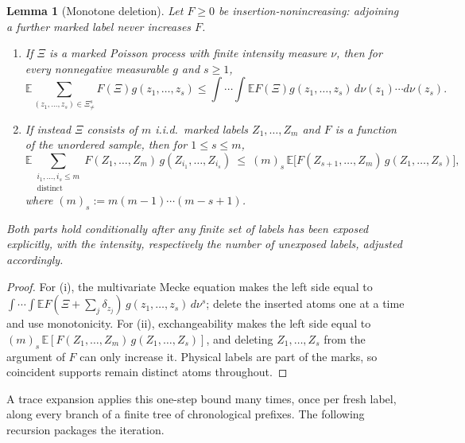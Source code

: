 \documentclass[11pt]{article}
\newtheorem{lemma}[lemma]{Lemma}
\theoremstyle{definition}
\theoremstyle{remark}
\newcommand{\E}{\mathbb E}
\newcommand{\1}{\mathbf 1}
\numberwithin{equation}{section}
\begin{document}
\begin{lemma}[Monotone deletion]\label{lem:poisson-insertion}\label{lem:fixed-deletion}
Let $F\ge0$ be insertion-nonincreasing: adjoining a further marked
label never increases $F$.
\begin{enumerate}
\item If $\Xi$ is a marked Poisson process with finite intensity
measure $\nu$, then for every nonnegative measurable $g$ and $s\ge1$,
\begin{equation}\label{eq:poisson-insertion}
 \E\!\sum_{(z_1,\ldots,z_s)\in\Xi_{\ne}^{s}}
 F(\Xi)g(z_1,\ldots,z_s)
 \le
 \int\!\cdots\!\int
 \E F(\Xi)g(z_1,\ldots,z_s)
 \,d\nu(z_1)\cdots d\nu(z_s).
\end{equation}
\item If instead $\Xi$ consists of $m$ i.i.d.\ marked labels
$Z_1,\ldots,Z_m$ and $F$ is a function of the unordered sample, then
for $1\le s\le m$,
\begin{equation}\label{eq:fixed-deletion}
 \E\sum_{\substack{i_1,\ldots,i_s\le m\\ \text{distinct}}}
 F(Z_1,\ldots,Z_m)\,g(Z_{i_1},\ldots,Z_{i_s})
 \ \le\
 (m)_s\,\E\bigl[F(Z_{s+1},\ldots,Z_m)\,g(Z_1,\ldots,Z_s)\bigr],
\end{equation}
where $(m)_s:=m(m-1)\cdots(m-s+1)$.
\end{enumerate}
Both parts hold conditionally after any finite set of labels has been
exposed explicitly, with the intensity, respectively the number of
unexposed labels, adjusted accordingly.
\end{lemma}
\begin{proof}
For (i), the multivariate Mecke equation makes the left side equal to
$\int\cdots\int\E F(\Xi+\sum_j\delta_{z_j})\,g(z_1,\ldots,z_s)\,d\nu^s$;
delete the inserted atoms one at a time and use monotonicity.  For
(ii), exchangeability makes the left side equal to
$(m)_s\,\E[F(Z_1,\ldots,Z_m)\,g(Z_1,\ldots,Z_s)]$, and deleting
$Z_1,\ldots,Z_s$ from the argument of $F$ can only increase it.
Physical labels are part of the marks, so coincident supports remain
distinct atoms throughout.
\end{proof}

A trace expansion applies this one-step bound many times, once per
fresh label, along every branch of a finite tree of chronological
prefixes.  The following recursion packages the iteration.
\end{document}
